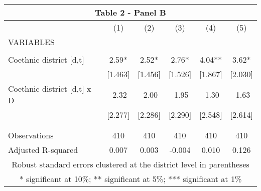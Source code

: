 \begin{tabular}{lccccc}
\multicolumn{6}{c}{Table 2 - Panel B} \\ \hline
 & (1) & (2) & (3) & (4) & (5) \\
VARIABLES &  &  &  &  &  \\ \hline
 &  &  &  &  &  \\
Coethnic district [d,t] & 2.59* & 2.52* & 2.76* & 4.04** & 3.62* \\
 & [1.463] & [1.456] & [1.526] & [1.867] & [2.030] \\
Coethnic district [d,t] x D & -2.32 & -2.00 & -1.95 & -1.30 & -1.63 \\
 & [2.277] & [2.286] & [2.290] & [2.548] & [2.614] \\
 &  &  &  &  &  \\
 &  &  &  &  &  \\
Observations & 410 & 410 & 410 & 410 & 410 \\
 Adjusted R-squared & 0.007 & 0.003 & -0.004 & 0.010 & 0.126 \\ \hline
\multicolumn{6}{c}{ Robust standard errors clustered at the district level in parentheses} \\
\multicolumn{6}{c}{ * significant at 10\%; ** significant at 5\%; *** significant at 1\%} \\
\end{tabular}
